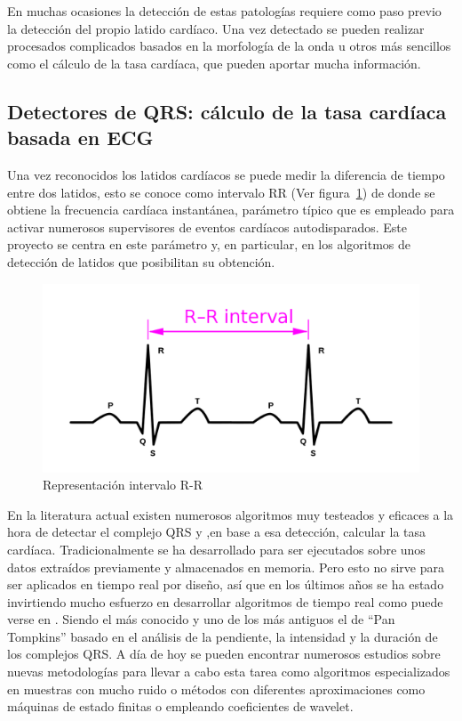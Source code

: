 En muchas ocasiones la detección de estas patologías requiere como paso previo la detección del propio latido cardíaco. Una vez detectado se pueden realizar procesados complicados basados en la morfología de la onda u otros más sencillos como el cálculo de la tasa cardíaca, que pueden aportar mucha información.

\subsection{Detectores de QRS: cálculo de la tasa cardíaca basada en ECG}

Una vez reconocidos los latidos cardíacos se puede medir la diferencia de tiempo entre dos latidos, esto se conoce como intervalo RR (Ver figura~\ref{fig:RRInterval})  de donde se obtiene la frecuencia cardíaca instantánea, parámetro típico que es empleado para activar numerosos supervisores de eventos cardíacos autodisparados. Este proyecto se centra en este parámetro y, en particular, en los algoritmos de detección de latidos que posibilitan su obtención.  

\begin{figure}[ht]
	\centering
		\includegraphics[width=0.6\linewidth]{figuras/RRInterval.png}
	\caption{Representación intervalo R-R}
	\label{fig:RRInterval}
\end{figure} 

En la literatura actual existen numerosos algoritmos muy testeados y eficaces a la hora de detectar el complejo QRS y ,en base a esa detección, calcular la tasa cardíaca. Tradicionalmente se ha desarrollado para ser ejecutados sobre unos datos extraídos previamente y almacenados en memoria. Pero esto no sirve para ser aplicados en tiempo real por diseño, así que en los últimos años se ha estado invirtiendo mucho esfuerzo en desarrollar algoritmos de tiempo real como puede verse en \cite{Arefin,Kohler}. Siendo el más conocido y uno de los más antiguos el de “Pan Tompkins” basado en el análisis de la pendiente, la intensidad y la duración de los complejos QRS.\cite{PanTompkins} A día de hoy se pueden encontrar numerosos estudios sobre nuevas metodologías para llevar a cabo esta tarea como algoritmos especializados en muestras con mucho ruido\cite{RsSlope} o métodos con diferentes aproximaciones como máquinas de estado finitas\cite{FSM} o empleando coeficientes de wavelet.\cite{Wavelet}

